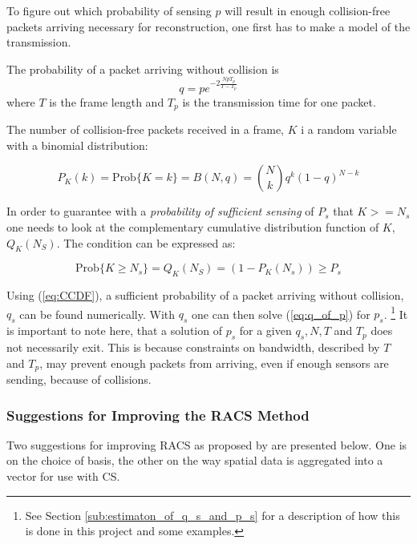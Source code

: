 \documentclass[Main]{subfiles}
\begin{document}
			To figure out which probability of sensing $p$ will result in enough collision-free packets arriving necessary for reconstruction, one first has to make a model of the transmission.

			The probability of a packet arriving without collision is
			\begin{equation}
				q = pe^{-2\frac{NpT_p}{T-T_p}}
				\label{eq:q_of_p} 
			\end{equation}
			where $T$ is the frame length and $T_p$ is the transmission time for one packet.

			\newpage
			The number of collision-free packets received in a frame, $K$ i a random variable with a binomial distribution:

			\begin{equation}
				P_K(k) = \text{Prob}\{K=k\} = B(N,q) =
					\binom{N}{k} q^k(1-q)^{N-k}
					\label{eq:BinomialModel}
			\end{equation}
			
			In order to guarantee with a \emph{probability of sufficient sensing} of $P_s$ that $K >= N_s$ one needs to look at the complementary cumulative distribution function of $K$, $Q_K(N_S)$.
			The condition can be expressed as:

			\begin{equation}
				\text{Prob}\{K \geq N_s\} = Q_K(N_S) = (1-P_K(N_s)) \geq P_s
				\label{eq:CCDF} 
			\end{equation}
			
			Using (\ref{eq:CCDF}), a sufficient probability of a packet arriving without collision, $q_s$ can be found numerically.
			With $q_s$ one can then solve (\ref{eq:q_of_p}) for $p_s$.
			\footnote{See Section \ref{sub:estimaton_of_q_s_and_p_s} for a description of how this is done in this project and some examples.}
			It is important to note here, that a solution of $p_s$ for a given $q_s, N, T$ and $T_p$ does not necessarily exit.
			This is because constraints on bandwidth, described by $T$ and $T_p$, may prevent enough packets from arriving, even if enough sensors are sending, because of collisions.

		\newpage
		\subsubsection{Suggestions for Improving the RACS Method} %
		\label{sub:suggestions_for_improving_the_racs_method}

			Two suggestions for improving RACS as proposed by \cite{Fazel2011} are presented below.
			One is on the choice of basis, the other on the way spatial data is aggregated into a vector for use with CS.
\end{document}
